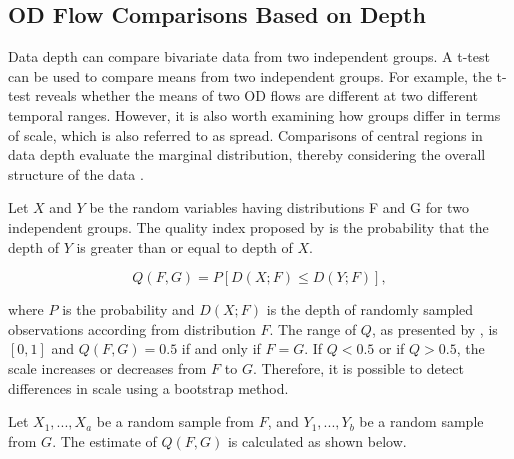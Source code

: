 \documentclass[a4paper,UKenglish]{lipics-v2018}
\providecommand{\DIFdelbegin}{} %
\providecommand{\DIFdelend}{} %
\begin{document}
\DIFdelbegin %

\DIFdelend \subsection{OD Flow Comparisons Based on Depth}
Data depth can compare bivariate data from two independent groups.
A t-test can be used to compare means from two independent groups.
For example, the t-test reveals whether the means of two OD flows are different at two different temporal ranges.
However, it is also worth examining how groups differ in terms of scale, which is also referred to as spread.
Comparisons of central regions in data depth evaluate the marginal distribution, thereby considering the overall structure of the data \cite{wilcox03MBR}.

Let $X$ and $Y$ be the random variables having distributions F and G for two independent groups.
The quality index proposed by \cite{liu93JASA} is the probability that the depth of $Y$ is greater than or equal to depth of $X$. 

\begin{equation*}
Q(F,G) = P[D(X;F) \leq D(Y;F)],
\end{equation*}

where $P$ is the probability and $D(X;F)$ is the depth of randomly sampled observations according from distribution $F$.
The range of $Q$, as presented by \cite{liu93JASA}, is $[0,1]$ and $Q(F,G) = 0.5$ if and only if $F = G$. If $Q < 0.5$  or if $Q > 0.5$, the scale increases or decreases from  $F$ to $G$.
Therefore, it is possible to detect differences in scale using a bootstrap method.

Let $X_1,...,X_a$ be a random sample from $F$, and $Y_1,...,Y_b$ be a random sample from $G$.
The estimate of $Q(F,G)$ is calculated as shown below.
\end{document}

